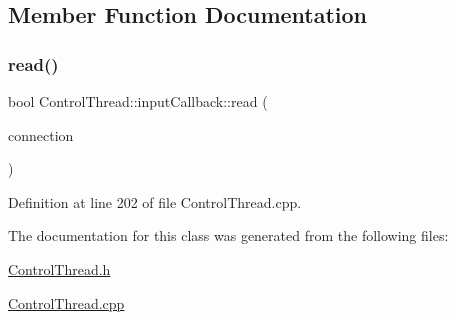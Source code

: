 \subsection{Member Function Documentation}
\hypertarget{classocra__recipes_1_1ControlThread_1_1inputCallback_a8c41c2ec6a86539d8bc0653fe79e3bec}{}\label{classocra__recipes_1_1ControlThread_1_1inputCallback_a8c41c2ec6a86539d8bc0653fe79e3bec} 
\subsubsection{\texorpdfstring{read()}{read()}}
{\footnotesize\ttfamily bool Control\+Thread\+::input\+Callback\+::read (\begin{DoxyParamCaption}\item[{yarp\+::os\+::\+Connection\+Reader \&}]{connection }\end{DoxyParamCaption})\hspace{0.3cm}{\ttfamily [virtual]}}



Definition at line 202 of file Control\+Thread.\+cpp.



The documentation for this class was generated from the following files\+:\begin{DoxyCompactItemize}
\item 
\hyperlink{ControlThread_8h}{Control\+Thread.\+h}\item 
\hyperlink{ControlThread_8cpp}{Control\+Thread.\+cpp}\end{DoxyCompactItemize}
